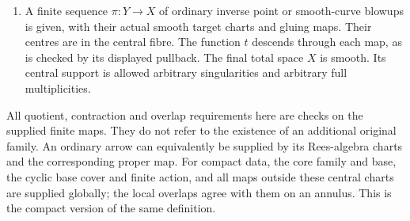 \begin{enumerate}
\item A finite sequence \(\pi:Y\to X\) of
ordinary inverse point or smooth-curve blowups
is given, with their actual smooth target charts
and gluing maps. Their centres are in the central
fibre. The function \(t\) descends through each
map, as is checked by its displayed pullback.
The final total space \(X\) is smooth. Its
central support is allowed arbitrary singularities
and arbitrary full multiplicities.
\end{enumerate}
All quotient, contraction and overlap requirements here
are checks on the supplied finite maps. They do not
refer to the existence of an additional original family.
An ordinary arrow can equivalently be supplied by its
Rees-algebra charts and the corresponding proper map.
For compact data, the core family and base, the cyclic
base cover and finite action, and all maps outside these
central charts are supplied globally; the local overlaps
agree with them on an annulus. This is the compact
version of the same definition.

